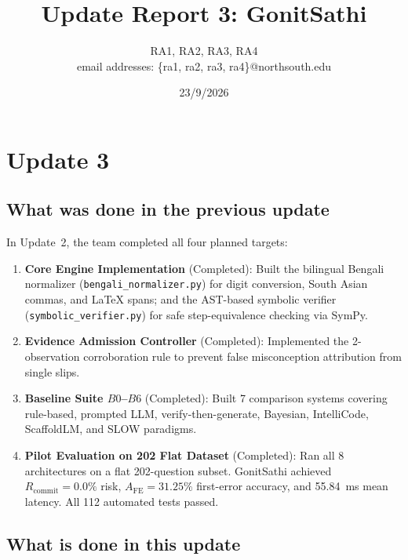 \documentclass[lettersize,onecolumn,journal]{IEEEtran}
\begin{document}
\title{Update Report 3: GonitSathi}
\date{23/9/2026}
\author{RA1, RA2, RA3, RA4\\
email addresses: \{ra1, ra2, ra3, ra4\}@northsouth.edu}
\maketitle

\section{Update 3}

\subsection{What was done in the previous update}

In Update~2, the team completed all four planned targets:

\begin{enumerate}
    \item \textbf{Core Engine Implementation} (Completed): Built the bilingual Bengali normalizer (\texttt{bengali\_normalizer.py}) for digit conversion, South Asian commas, and LaTeX spans; and the AST-based symbolic verifier (\texttt{symbolic\_verifier.py}) for safe step-equivalence checking via SymPy.
    \item \textbf{Evidence Admission Controller} (Completed): Implemented the 2-observation corroboration rule to prevent false misconception attribution from single slips.
    \item \textbf{Baseline Suite $B0$--$B6$} (Completed): Built 7 comparison systems covering rule-based, prompted LLM, verify-then-generate, Bayesian, IntelliCode, ScaffoldLM, and SLOW paradigms.
    \item \textbf{Pilot Evaluation on 202 Flat Dataset} (Completed): Ran all 8 architectures on a flat 202-question subset. GonitSathi achieved $R_{\text{commit}} = 0.0\%$ risk, $A_{\text{FE}} = 31.25\%$ first-error accuracy, and 55.84~ms mean latency. All 112 automated tests passed.
\end{enumerate}

\subsection{What is done in this update}
\end{document}

